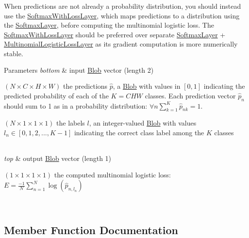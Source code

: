 When predictions are not already a probability distribution, you should instead use the \hyperlink{classcaffe_1_1SoftmaxWithLossLayer}{Softmax\+With\+Loss\+Layer}, which maps predictions to a distribution using the \hyperlink{classcaffe_1_1SoftmaxLayer}{Softmax\+Layer}, before computing the multinomial logistic loss. The \hyperlink{classcaffe_1_1SoftmaxWithLossLayer}{Softmax\+With\+Loss\+Layer} should be preferred over separate \hyperlink{classcaffe_1_1SoftmaxLayer}{Softmax\+Layer} + \hyperlink{classcaffe_1_1MultinomialLogisticLossLayer}{Multinomial\+Logistic\+Loss\+Layer} as its gradient computation is more numerically stable.


\begin{DoxyParams}{Parameters}
{\em bottom} & input \hyperlink{classcaffe_1_1Blob}{Blob} vector (length 2)
\begin{DoxyEnumerate}
\item $ (N \times C \times H \times W) $ the predictions $ \hat{p} $, a \hyperlink{classcaffe_1_1Blob}{Blob} with values in $ [0, 1] $ indicating the predicted probability of each of the $ K = CHW $ classes. Each prediction vector $ \hat{p}_n $ should sum to 1 as in a probability distribution\+: $ \forall n \sum\limits_{k=1}^K \hat{p}_{nk} = 1 $.
\item $ (N \times 1 \times 1 \times 1) $ the labels $ l $, an integer-\/valued \hyperlink{classcaffe_1_1Blob}{Blob} with values $ l_n \in [0, 1, 2, ..., K - 1] $ indicating the correct class label among the $ K $ classes 
\end{DoxyEnumerate}\\
\hline
{\em top} & output \hyperlink{classcaffe_1_1Blob}{Blob} vector (length 1)
\begin{DoxyEnumerate}
\item $ (1 \times 1 \times 1 \times 1) $ the computed multinomial logistic loss\+: $ E = \frac{-1}{N} \sum\limits_{n=1}^N \log(\hat{p}_{n,l_n}) $ 
\end{DoxyEnumerate}\\
\hline
\end{DoxyParams}


\subsection{Member Function Documentation}
